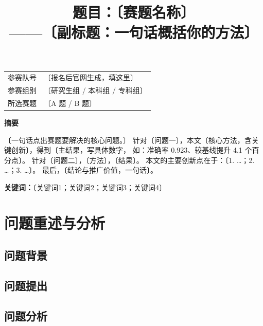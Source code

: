 \documentclass[12pt, a4paper]{ctexart}
\title{\textbf{题目：〔赛题名称〕}\\[6pt]
       \large ——〔副标题：一句话概括你的方法〕}
\author{}
\date{}
\begin{document}
\maketitle
\thispagestyle{empty}

\vspace{-1cm}
\begin{center}
\begin{tabular}{ll}
\toprule
参赛队号 & 〔报名后官网生成，填这里〕 \\
参赛组别 & 〔研究生组 / 本科组 / 专科组〕 \\
所选赛题 & 〔A 题 / B 题〕 \\
\bottomrule
\end{tabular}
\end{center}

\vspace{0.5cm}

\begin{center}
\textbf{\large 摘\quad 要}
\end{center}

\noindent
〔一句话点出赛题要解决的核心问题。〕
针对〔问题一〕，本文〔核心方法，含关键创新〕，得到〔主结果，写具体数字，
如：准确率 0.923、较基线提升 4.1 个百分点〕。
针对〔问题二〕，〔方法〕，〔结果〕。
本文的主要创新点在于：〔1. …；2. …；3. …〕。
最后，〔结论与推广价值，一句话〕。

\vspace{0.3cm}
\noindent\textbf{关键词：}〔关键词1；关键词2；关键词3；关键词4〕

\newpage

\section{问题重述与分析}
\subsection{问题背景}
\subsection{问题提出}
\subsection{问题分析}   %
\end{document}
